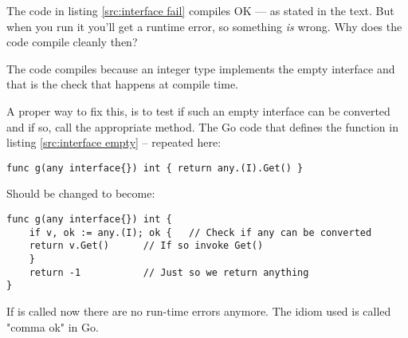 \begin{Exercise}[title={Interfaces and compilation},difficulty=6]
\Question
The code in listing \ref{src:interface fail} compiles OK --- as stated 
in the text. But when you run it you'll get a runtime error, so
something \emph{is} wrong. Why does the code compile cleanly then?
\end{Exercise}

\begin{Answer}
\Question
The code compiles because an integer type implements the empty interface
and that is the check that happens at compile time.

A proper way to fix this, is to test if such an empty interface can
be converted and if so, call the appropriate method. The Go code
that defines the function  in listing \ref{src:interface empty}
-- repeated here:
\begin{lstlisting}
func g(any interface{}) int { return any.(I).Get() }
\end{lstlisting}

\noindent{}Should be changed to become:
\begin{lstlisting}
func g(any interface{}) int {
    if v, ok := any.(I); ok {	// Check if any can be converted
	return v.Get()		// If so invoke Get()
    }
    return -1			// Just so we return anything
}
\end{lstlisting}
If  is called now there are no run-time errors anymore. The
idiom used is called "comma ok" in Go.
\end{Answer}
